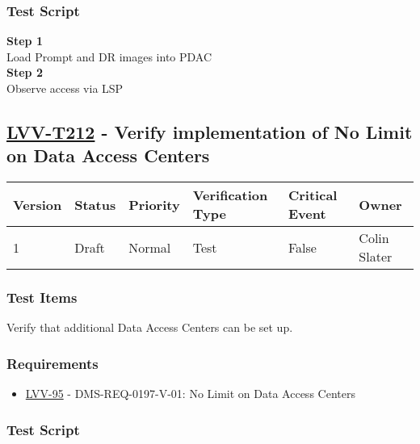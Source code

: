 \subsubsection{Test Script}\label{test-script-65}

\textbf{Step 1}\\
Load Prompt and DR images into PDAC\\[2\baselineskip]\textbf{Step 2}\\
Observe access via LSP\\[2\baselineskip]

\hypertarget{lvv-t212---verify-implementation-of-no-limit-on-data-access-centers}{\subsection{\texorpdfstring{\href{https://jira.lsstcorp.org/secure/Tests.jspa\#/testCase/LVV-T212}{LVV-T212}
- Verify implementation of No Limit on Data Access
Centers}{LVV-T212 - Verify implementation of No Limit on Data Access Centers}}\label{lvv-t212---verify-implementation-of-no-limit-on-data-access-centers}}

\begin{longtable}[]{@{}llllll@{}}
\toprule
Version & Status & Priority & Verification Type & Critical Event &
Owner\tabularnewline
\midrule
\endhead
1 & Draft & Normal & Test & False & Colin Slater\tabularnewline
\bottomrule
\end{longtable}

\subsubsection{Test Items}\label{test-items-65}

Verify that additional Data Access Centers can be set up.

\subsubsection{Requirements}\label{requirements-66}

\begin{itemize}
\tightlist
\item
  \href{https://jira.lsstcorp.org/browse/LVV-95}{LVV-95} -
  DMS-REQ-0197-V-01: No Limit on Data Access Centers
\end{itemize}

\subsubsection{Test Script}\label{test-script-66}

